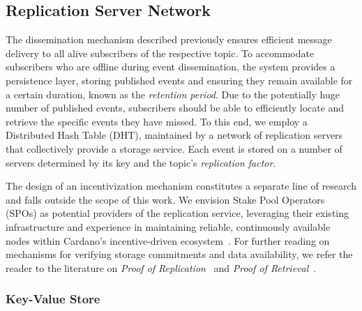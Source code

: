 \subsection{Replication Server Network}
\label{subsec:replication-server-network}

The dissemination mechanism described previously ensures efficient message delivery to all alive subscribers of the respective topic.
To accommodate subscribers who are offline during event dissemination, the system provides a persistence layer, storing published events and ensuring they remain available for a certain duration, known as the \emph{retention period}. 
Due to the potentially huge number of published events, subscribers should be able to efficiently locate and retrieve the specific events they have missed.
To this end, we employ a Distributed Hash Table (DHT), maintained by a network of replication servers that collectively provide a storage service.
Each event is stored on a number of servers determined by its key and the topic's \emph{replication factor}.

The design of an incentivization mechanism constitutes a separate line of research and falls outside the scope of this work.
We envision Stake Pool Operators (SPOs) as potential providers of the replication service, leveraging their existing infrastructure and experience in maintaining reliable, continuously available nodes within Cardano's incentive-driven ecosystem~\cite{Cardano-SPOs}.
For further reading on mechanisms for verifying storage commitments and data availability, we refer the reader to the literature on \emph{Proof of Replication}~\cite{PoReplication, PoReplicationScaling} and \emph{Proof of Retrieval}~\cite{PoRTheoryAndPractice, PoRCompact, PoRLargeFiles}.

\subsubsection{Key-Value Store}

